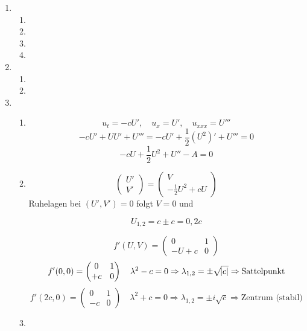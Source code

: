 \documentclass[a4paper,11pt]{scrartcl}
\begin{document}
\begin{enumerate}[label*=\textbf{8.\arabic*.}]
\begin{enumerate}
\end{enumerate}

\item \begin{enumerate}
  \item
  \item
  \item
  \item
\end{enumerate}

\item \begin{enumerate}
  \item
  \item
\end{enumerate}

\item \begin{enumerate}
  \item
    \[u_t = -c U', \quad u_x = U', \quad u_{xxx} = U''' \]
    \[-c U' + U U' + U''' = -c U' + \frac{1}{2} (U^2)'+U''' = 0\]
    \[-c U + \frac{1}{2} U^2 + U'' - A = 0\]
  \item
    \[\begin{pmatrix}U'\\V'\end{pmatrix} =
      \begin{pmatrix}
        V\\-\frac{1}{2} U^2 + cU
      \end{pmatrix}
  \]
  Ruhelagen bei $(U', V') = 0$ folgt $V = 0$ und

  \[U_{1, 2} = c \pm c = 0, 2c\]

  \[f'(U, V) = \begin{pmatrix} 0&1\\-U + c&0 \end{pmatrix} \]
  \[f'(0, 0) = \begin{pmatrix} 0&1\\+ c&0 \end{pmatrix} \quad \lambda^2
    - c = 0 \Rightarrow \lambda_{1,2} = \pm \sqrt{\abs{c}} \Rightarrow \text{Sattelpunkt} \]
  \[f'(2c, 0) = \begin{pmatrix} 0&1\\-c&0 \end{pmatrix} \quad \lambda^2
    + c = 0 \Rightarrow \lambda_{1,2} = \pm i\sqrt{c} \Rightarrow \text{Zentrum (stabil)} \]
  \item


\end{enumerate}
\end{enumerate}
\end{document}
